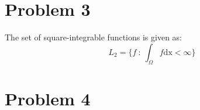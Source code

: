 \documentclass[12pt]{article}
\begin{document}
\section*{Problem 3}
The set of square-integrable functions is given as:
\begin{equation}
L_2 = \{f \ : \ \int_\Omega f \mathrm{dx} < \infty\}
\end{equation}
\section*{Problem 4}
 

\pagebreak
\appendix
\end{document}
